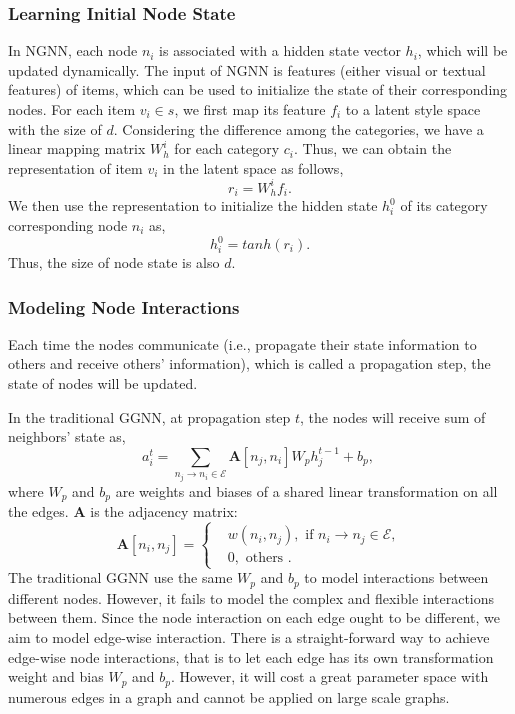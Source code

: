\documentclass[sigconf]{acmart}
\begin{document}
\subsubsection{Learning Initial Node State}\label{sect:input}
In NGNN, each node $n_{i}$ is associated with a hidden state vector $h_{i} $, which will be updated dynamically.
The input of NGNN is features (either visual or textual features) of items, which can be used to initialize the state of their corresponding nodes.
For each item $v_{i} \in s$, we first map its feature $f_{i}$ to a latent style space with the size of $d$.
Considering the difference among the categories, we have a linear mapping matrix $W_{h}^{i}$ for each category $c_{i}$. Thus, we can obtain the representation of item $v_{i}$ in the latent space as follows,
\begin{equation} \label{latent}
r_{i} = W_{h}^{i}f_i.
\end{equation}
 We then use the representation to initialize the hidden state
$h_{i}^{0}$  of its category corresponding node $n_{i}$ as,
\begin{equation} \label{initial1}
h_{i}^{0} = tanh(r_{i}).
\end{equation}
Thus, the size of node state is also $d$.


\subsubsection{Modeling Node Interactions}


Each time the nodes communicate (i.e., propagate their state information to others and receive others' information), which is called a propagation step, the state of nodes will be updated.


In the traditional GGNN, at propagation step $t$, the nodes will receive sum of neighbors' state as,
 \begin{equation} \label{ggnn_original}
a_{i}^{t} = \sum_{n_{j} \rightarrow n_{i} \in \mathcal{E}} \mathbf{A}[n_{j}, n_{i}] W_{p} h_{j}^{t-1} + b_{p},~
\end{equation}
where $W_{p}$ and $b_{p}$ are weights and biases of a shared linear transformation on all the edges. $\mathbf{A}$ is the adjacency matrix:
\begin{equation} \label{a}
\mathbf{A}[n_{i}, n_{j}]=\begin{cases}
 & w(n_{i}, n_{j}),  \text{ if }  n_{i}\rightarrow n_{j} \in \mathcal{E}, \\
 & 0, \text{ others }.
\end{cases}
\end{equation}
The traditional GGNN use the same $W_{p}$ and $b_{p}$ to model interactions between different nodes.
 However, it fails to model the complex and flexible interactions between them.
Since the node interaction on each edge ought to be different, we aim to model edge-wise interaction. There is a straight-forward way to achieve edge-wise node interactions, that is to let each edge has its own transformation weight and bias $W_{p}$ and $b_{p}$. However, it will cost a great parameter space with numerous edges in a graph and cannot be applied on large scale graphs.
\end{document}
